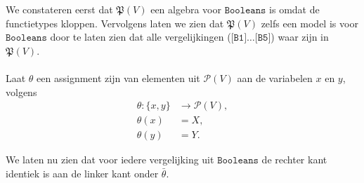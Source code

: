 \documentclass[a4paper,11pt]{article}
\begin{document}
We constateren eerst dat $\mathfrak{P}(V)$ een algebra voor
$\texttt{Booleans}$ is omdat de functietypes kloppen. Vervolgens laten we zien
dat $\mathfrak{P}(V)$ zelfs een model is voor $\texttt{Booleans}$ door te
laten zien dat alle vergelijkingen ($\texttt{[B1]} \ldots \texttt{[B5]}$) waar
zijn in $\mathfrak{P}(V)$.

\paragraph{}

Laat $\theta$ een assignment zijn van elementen uit $\mathcal{P}(V)$ aan
de variabelen $x$ en $y$, volgens
\begin{align*}
\theta    : \{x,y\} &\rightarrow \mathcal{P}(V), \\
\theta(x) &= X, \\
\theta(y) &= Y.
\end{align*}

We laten nu zien dat voor iedere vergelijking uit $\texttt{Booleans}$ de
rechter kant identiek is aan de linker kant onder $\bar \theta$.
\end{document}
